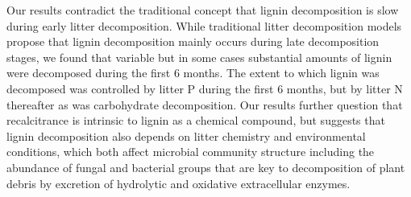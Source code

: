 Our results contradict the traditional concept that lignin decomposition is slow during early litter decomposition. While traditional litter decomposition models propose that lignin decomposition mainly occurs during late decomposition stages, we found that variable but in some cases substantial amounts of lignin were decomposed during the first 6 months. The extent to which lignin was decomposed was controlled by litter P during the first 6 months, but by litter N thereafter as was carbohydrate decomposition. Our results further question that recalcitrance is intrinsic to lignin as a chemical compound, but suggests that lignin decomposition also depends on litter chemistry and environmental conditions, which both affect microbial community structure including the abundance of fungal and bacterial groups that are key to decomposition of plant debris by excretion of hydrolytic and oxidative extracellular enzymes.

